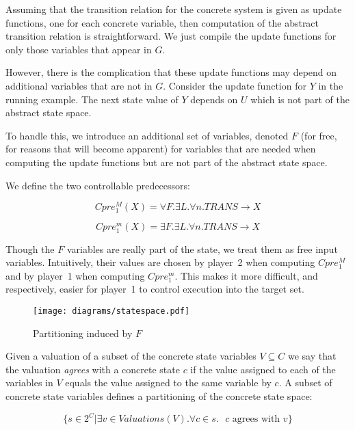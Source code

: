Assuming that the transition relation for the concrete system is given as update functions, one for each concrete variable, then computation of the abstract transition relation is straightforward. We just compile the update functions for only those variables that appear in $G$.

However, there is the complication that these update functions may depend on additional variables that are not in $G$. Consider the update function for $Y$ in the running example. The next state value of $Y$ depends on $U$ which is not part of the abstract state space.

To handle this, we introduce an additional set of variables, denoted $F$ (for free, for reasons that will become apparent) for variables that are needed when computing the update functions but are not part of the abstract state space.

We define the two controllable predecessors:

\begin{equation}
    \label{eqn:symb_cpre_M}
    Cpre_1^M(X) = \forall F. \exists L. \forall n. TRANS \rightarrow X
\end{equation}

\begin{equation}
    \label{eqn:symb_cpre_m}
    Cpre_1^m(X) = \exists F. \exists L. \forall n. TRANS \rightarrow X
\end{equation}

Though the $F$ variables are really part of the state, we treat them as free input variables. Intuitively, their values are chosen by player~2 when computing $Cpre_1^M$ and by player~1 when computing $Cpre_1^m$. This makes it more difficult, and respectively, easier for player~1 to control execution into the target set.

\begin{figure}
\centering
\texttt{[image: diagrams/statespace.pdf]}
\caption{Partitioning induced by $F$}
\label{fig:f_partitioning}
\end{figure}

Given a valuation of a subset of the concrete state variables $V \subseteq C$ we say that the valuation \emph{agrees} with a concrete state $c$ if the value assigned to each of the variables in $V$ equals the value assigned to the same variable by $c$. A subset of concrete state variables defines a partitioning of the concrete state space: 

\begin{equation}
    \{ s \in 2^C | \exists v \in Valuations(V). \forall c \in s. \text{ $c$ agrees with $v$} \}
\end{equation}

